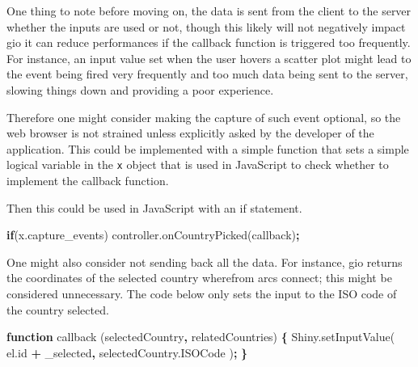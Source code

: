 \documentclass[
  10pt,
]{krantz}
\makeatletter
\newenvironment{Shaded}{\begin{snugshade}}{\end{snugshade}}
\newcommand{\AttributeTok}[1]{\textcolor[rgb]{0.61,0.61,0.61}{#1}}
\newcommand{\CommentTok}[1]{\textcolor[rgb]{0.37,0.37,0.37}{\textit{#1}}}
\newcommand{\ControlFlowTok}[1]{\textcolor[rgb]{0.27,0.27,0.27}{\textbf{#1}}}
\newcommand{\KeywordTok}[1]{\textcolor[rgb]{0.27,0.27,0.27}{\textbf{#1}}}
\newcommand{\NormalTok}[1]{#1}
\newcommand{\OperatorTok}[1]{\textcolor[rgb]{0.43,0.43,0.43}{\textbf{#1}}}
\newcommand{\OtherTok}[1]{\textcolor[rgb]{0.37,0.37,0.37}{#1}}
\newcommand{\StringTok}[1]{\textcolor[rgb]{0.5,0.5,0.5}{#1}}
\newcommand{\VariableTok}[1]{\textcolor[rgb]{0,0,0}{#1}}
\newenvironment{kframe}{%
\medskip{}
\setlength{\fboxsep}{.8em}
 \def\at@end@of@kframe{}%
 \ifinner\ifhmode%
  \def\at@end@of@kframe{\end{minipage}}%
  \begin{minipage}{\columnwidth}%
 \fi\fi%
 \def\FrameCommand##1{\hskip\@totalleftmargin \hskip-\fboxsep
 \colorbox{shadecolor}{##1}\hskip-\fboxsep
     \hskip-\linewidth \hskip-\@totalleftmargin \hskip\columnwidth}%
 \MakeFramed {\advance\hsize-\width
   \@totalleftmargin\z@ \linewidth\hsize
   \@setminipage}}%
 {\par\unskip\endMakeFramed%
 \at@end@of@kframe}
\renewenvironment{Shaded}{\begin{kframe}}{\end{kframe}}
\makeatother
\begin{document}
One thing to note before moving on, the data is sent from the client to the server whether the inputs are used or not, though this likely will not negatively impact gio it can reduce performances if the callback function is triggered too frequently. For instance, an input value set when the user hovers a scatter plot might lead to the event being fired very frequently and too much data being sent to the server, slowing things down and providing a poor experience.

Therefore one might consider making the capture of such event optional, so the web browser is not strained unless explicitly asked by the developer of the application. This could be implemented with a simple function that sets a simple logical variable in the \texttt{x} object that is used in JavaScript to check whether to implement the callback function.

\begin{Shaded}
\end{Shaded}

Then this could be used in JavaScript with an if statement.

\begin{Shaded}
\begin{Highlighting}[]
\ControlFlowTok{if}\NormalTok{(}\VariableTok{x}\NormalTok{.}\AttributeTok{capture\_events}\NormalTok{)}
  \VariableTok{controller}\NormalTok{.}\AttributeTok{onCountryPicked}\NormalTok{(callback)}\OperatorTok{;}
\end{Highlighting}
\end{Shaded}

One might also consider not sending back all the data. For instance, gio returns the coordinates of the selected country wherefrom arcs connect; this might be considered unnecessary. The code below only sets the input to the ISO code of the country selected.

\begin{Shaded}
\begin{Highlighting}[]
\KeywordTok{function} \AttributeTok{callback}\NormalTok{ (selectedCountry}\OperatorTok{,}\NormalTok{ relatedCountries) }\OperatorTok{\{}
  \VariableTok{Shiny}\NormalTok{.}\AttributeTok{setInputValue}\NormalTok{(}
    \VariableTok{el}\NormalTok{.}\AttributeTok{id} \OperatorTok{+} \StringTok{\textquotesingle{}\_selected\textquotesingle{}}\OperatorTok{,} 
    \VariableTok{selectedCountry}\NormalTok{.}\AttributeTok{ISOCode}
\NormalTok{  )}\OperatorTok{;}
\OperatorTok{\}}
\end{Highlighting}
\end{Shaded}
\end{document}
